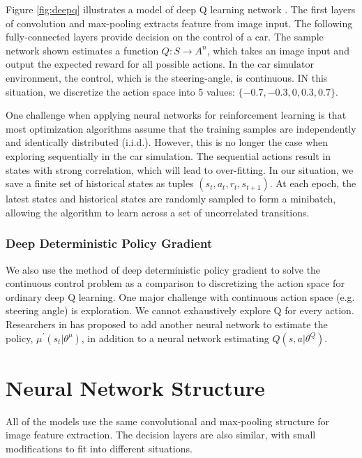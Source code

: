 \documentclass[a4paper]{article}
\begin{document}
Figure \ref{fig:deepq} illustrates a model of deep Q learning network \cite{mnih2015human}. The first layers of convolution and max-pooling extracts feature from image input. The following fully-connected layers provide decision on the control of a car. The sample network shown estimates a function $Q : S \rightarrow A^n$, which takes an image input and output the expected reward for all possible actions. In the car simulator environment, the control, which is the steering-angle, is continuous. IN this situation, we discretize the action space into 5 values: $\{-0.7, -0.3, 0, 0.3, 0.7\}$.

One challenge when applying neural networks for reinforcement learning is that most optimization algorithms assume that the training samples are independently and identically distributed (i.i.d.). However, this is no longer the case when exploring sequentially in the car simulation. The sequential actions result in states with strong correlation, which will lead to over-fitting. In our situation, we save a finite set of historical states as tuples $(s_t, a_t, r_t, s_{t+1})$. At each epoch, the latest states and historical states are randomly sampled to form a minibatch, allowing the algorithm to learn across a set of uncorrelated transitions.

\subsubsection{ Deep Deterministic Policy Gradient}

We also use the method of deep deterministic policy gradient \cite{lillicrap2015continuous} to solve the continuous control problem as a comparison to discretizing the action space for ordinary deep Q learning. One major challenge with continuous action space (e.g. steering angle) is exploration. We cannot exhaustively explore Q for every action. Researchers in \cite{lillicrap2015continuous} has proposed to add another neural network to estimate the policy, $\mu^{\prime}(s_t | \theta^{\mu})$, in addition to a neural network estimating $Q(s, a| \theta^Q)$. 




\section{Neural Network Structure}
All of the models use the same convolutional and max-pooling structure for image feature extraction. The decision layers are also similar, with small modifications to fit into different situations.
\end{document}
